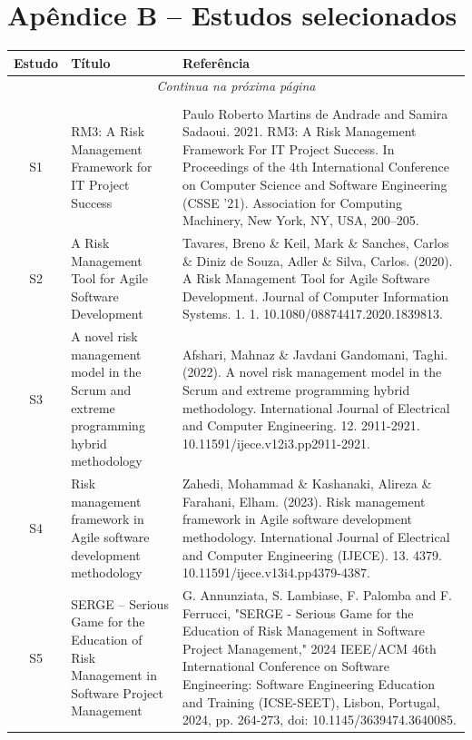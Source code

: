 \documentclass[
	12pt,
	openright,
	twoside,
	a4paper,
	english,
	brazil
	]{abntex2}
\begin{document}
\chapter*{Apêndice B – Estudos selecionados}
\label{apendiceB}

\vspace{-2em} %

\begin{longtable}{|c|p{5.5cm}|p{7.5cm}|}
  \hline
  \textbf{Estudo} & \textbf{Título} & \textbf{Referência} \\
  \hline
  \endfirsthead
  \hline
  \multicolumn{3}{|c|}{\textit{Continua na próxima página}} \\
  \hline
  \endfoot
  \hline
  \multicolumn{3}{|c|}{\textit{Fim da tabela}} \\
  \hline
  \endlastfoot
  S1 & RM3: A Risk Management Framework for IT Project Success & Paulo Roberto Martins de Andrade and Samira Sadaoui. 2021. RM3: A Risk Management Framework For IT Project Success. In Proceedings of the 4th International Conference on Computer Science and Software Engineering (CSSE '21). Association for Computing Machinery, New York, NY, USA, 200–205. \\
  \hline
  S2 & A Risk Management Tool for Agile Software Development & Tavares, Breno \& Keil, Mark \& Sanches, Carlos \& Diniz de Souza, Adler \& Silva, Carlos. (2020). A Risk Management Tool for Agile Software Development. Journal of Computer Information Systems. 1. 1. 10.1080/08874417.2020.1839813. \\
  \hline
  S3 & A novel risk management model in the Scrum and extreme programming hybrid methodology & Afshari, Mahnaz \& Javdani Gandomani, Taghi. (2022). A novel risk management model in the Scrum and extreme programming hybrid methodology. International Journal of Electrical and Computer Engineering. 12. 2911-2921. 10.11591/ijece.v12i3.pp2911-2921. \\
  \hline
  S4 & Risk management framework in Agile software development methodology & Zahedi, Mohammad \& Kashanaki, Alireza \& Farahani, Elham. (2023). Risk management framework in Agile software development methodology. International Journal of Electrical and Computer Engineering (IJECE). 13. 4379. 10.11591/ijece.v13i4.pp4379-4387. \\
  \hline
  S5 & SERGE – Serious Game for the Education of Risk Management in Software Project Management & G. Annunziata, S. Lambiase, F. Palomba and F. Ferrucci, "SERGE - Serious Game for the Education of Risk Management in Software Project Management," 2024 IEEE/ACM 46th International Conference on Software Engineering: Software Engineering Education and Training (ICSE-SEET), Lisbon, Portugal, 2024, pp. 264-273, doi: 10.1145/3639474.3640085. \\

\end{longtable}
\end{document}
